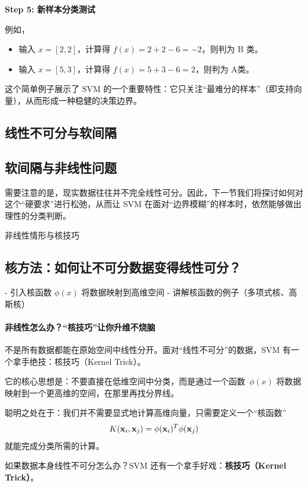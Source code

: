 \textbf{Step 5: 新样本分类测试}

例如，
\begin{itemize}
\item 输入 $x = [2, 2]$，计算得 $f(x) = 2 + 2 - 6 = -2$，则判为 B 类。
\item 输入 $x = [5, 3]$，计算得 $f(x) = 5 + 3 - 6 = 2$，则判为 A类。
\end{itemize}


这个简单例子展示了 SVM 的一个重要特性：它只关注“最难分的样本”（即支持向量），从而形成一种稳健的决策边界。

\subsection{线性不可分与软间隔}

\subsection{软间隔与非线性问题}



需要注意的是，现实数据往往并不完全线性可分。因此，下一节我们将探讨如何对这个“硬要求”进行松弛，从而让 SVM 在面对“边界模糊”的样本时，依然能够做出理性的分类判断。



非线性情形与核技巧
\subsection{核方法：如何让不可分数据变得线性可分？}

 - 引入核函数 $\phi(x)$ 将数据映射到高维空间
  - 讲解核函数的例子（多项式核、高斯核）


\paragraph*{非线性怎么办？“核技巧”让你升维不烧脑}
不是所有数据都能在原始空间中线性分开。面对“线性不可分”的数据，SVM 有一个拿手绝技：核技巧（Kernel Trick）。

它的核心思想是：不要直接在低维空间中分类，而是通过一个函数~$\phi(x)$ 将数据映射到一个更高维的空间，在那里再找分界线。

聪明之处在于：我们并不需要显式地计算高维向量，只需要定义一个“核函数”
$$
K({\bf x}_i, {\bf x}_j) =\phi({\bf x}_i)^T\phi({\bf x}_j) 
$$
就能完成分类所需的计算。

如果数据本身线性不可分怎么办？SVM 还有一个拿手好戏：{\bf 核技巧（Kernel Trick）}。

